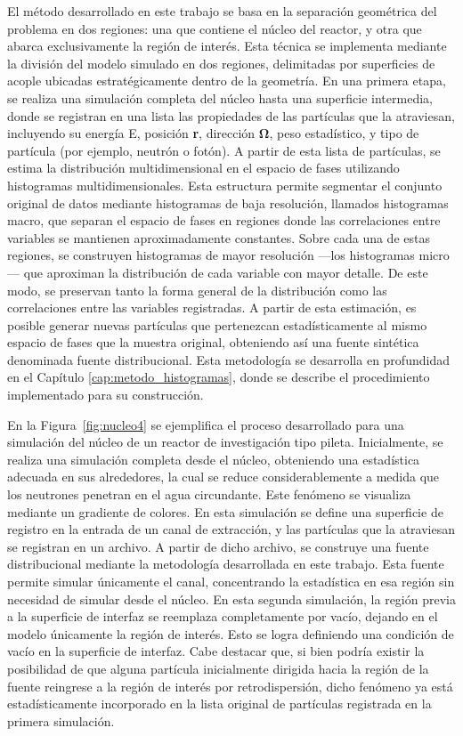 El método desarrollado en este trabajo se basa en la separación geométrica del problema en dos regiones: una que contiene el núcleo del reactor, y otra que abarca exclusivamente la región de interés. Esta técnica se implementa mediante la división del modelo simulado en dos regiones, delimitadas por superficies de acople ubicadas estratégicamente dentro de la geometría. En una primera etapa, se realiza una simulación completa del núcleo hasta una superficie intermedia, donde se registran en una lista las propiedades de las partículas que la atraviesan, incluyendo su energía E, posición \textbf{r}, dirección $\mathbf{\Omega}$, peso estadístico, y tipo de partícula (por ejemplo, neutrón o fotón). A partir de esta lista de partículas, se estima la distribución multidimensional en el espacio de fases utilizando histogramas multidimensionales. Esta estructura permite segmentar el conjunto original de datos mediante histogramas de baja resolución, llamados histogramas macro, que separan el espacio de fases en regiones donde las correlaciones entre variables se mantienen aproximadamente constantes. Sobre cada una de estas regiones, se construyen histogramas de mayor resolución —los histogramas micro— que aproximan la distribución de cada variable con mayor detalle. De este modo, se preservan tanto la forma general de la distribución como las correlaciones entre las variables registradas. A partir de esta estimación, es posible generar nuevas partículas que pertenezcan estadísticamente al mismo espacio de fases que la muestra original, obteniendo así una fuente sintética denominada fuente distribucional. Esta metodología se desarrolla en profundidad en el Capítulo \ref{cap:metodo_histogramas}, donde se describe el procedimiento implementado para su construcción.

En la Figura~\ref{fig:nucleo4} se ejemplifica el proceso desarrollado para una simulación del núcleo de un reactor de investigación tipo pileta. Inicialmente, se realiza una simulación completa desde el núcleo, obteniendo una estadística adecuada en sus alrededores, la cual se reduce considerablemente a medida que los neutrones penetran en el agua circundante. Este fenómeno se visualiza mediante un gradiente de colores. En esta simulación se define una superficie de registro en la entrada de un canal de extracción, y las partículas que la atraviesan se registran en un archivo. A partir de dicho archivo, se construye una fuente distribucional mediante la metodología desarrollada en este trabajo. Esta fuente permite simular únicamente el canal, concentrando la estadística en esa región sin necesidad de simular desde el núcleo. En esta segunda simulación, la región previa a la superficie de interfaz se reemplaza completamente por vacío, dejando en el modelo únicamente la región de interés. Esto se logra definiendo una condición de vacío en la superficie de interfaz. Cabe destacar que, si bien podría existir la posibilidad de que alguna partícula inicialmente dirigida hacia la región de la fuente reingrese a la región de interés por retrodispersión, dicho fenómeno ya está estadísticamente incorporado en la lista original de partículas registrada en la primera simulación.

